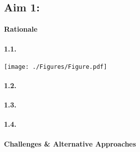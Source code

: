 
\subsection{Aim 1: \SpecificAimOne}

\paragraph{Rationale}

\lipsum[1-1]

\paragraph{1.1. \SpecificAimOneA}
\lipsum[2-2]

\begin{Figure}
	\texttt{[image: ./Figures/Figure.pdf]}
\end{Figure}


\paragraph{1.2. \SpecificAimOneB}

\lipsum[3-3]

\paragraph{1.3. \SpecificAimOneC}

\lipsum[4-4]

\paragraph{1.4. \SpecificAimOneD}

\lipsum[5-5]

\paragraph{Challenges \& Alternative Approaches}

\lipsum[6-6]
